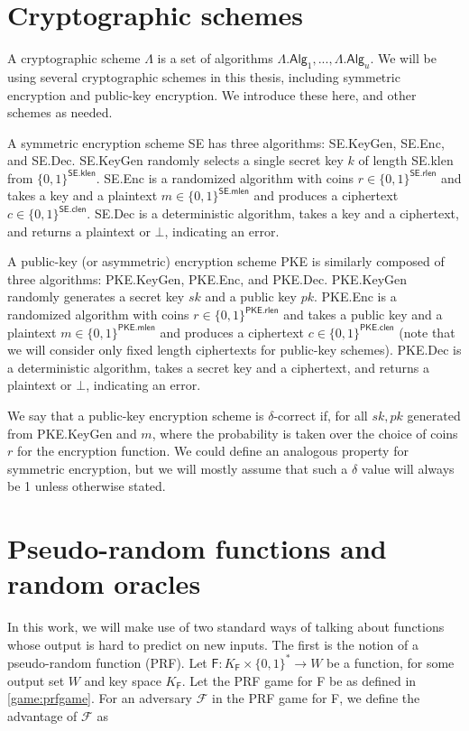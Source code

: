 \section{Cryptographic schemes}
A cryptographic scheme $\mathsf{\Lambda}$ is a set of algorithms $\mathsf{\Lambda.Alg}_1,..., \mathsf{\Lambda.Alg}_u$. We will be using several cryptographic schemes in this thesis, including symmetric encryption and public-key encryption. We introduce these here, and other schemes as needed.

A symmetric encryption scheme \textsf{SE} has three algorithms: \textsf{SE.KeyGen}, \textsf{SE.Enc}, and \textsf{SE.Dec}. \textsf{SE.KeyGen} randomly selects a single secret key $k$ of length \textsf{SE.klen} from $\{0,1\}^\mathsf{SE.klen}$. \textsf{SE.Enc} is a randomized algorithm with coins $r\in \{0,1\}^\mathsf{SE.rlen}$ and takes a key and a plaintext $m\in \{0,1\}^\mathsf{SE.mlen}$ and produces a ciphertext $c\in \{0,1\}^\mathsf{SE.clen}$. \textsf{SE.Dec} is a deterministic algorithm, takes a key and a ciphertext, and returns a plaintext or $\bot$, indicating an error.

A public-key (or asymmetric) encryption scheme \textsf{PKE} is similarly composed of three algorithms: \textsf{PKE.KeyGen}, \textsf{PKE.Enc}, and \textsf{PKE.Dec}. \textsf{PKE.KeyGen} randomly generates a secret key $sk$ and a public key $pk$. \textsf{PKE.Enc} is a randomized algorithm with coins $r\in \{0,1\}^\mathsf{PKE.rlen}$ and takes a public key and a plaintext $m\in \{0,1\}^\mathsf{PKE.mlen}$ and produces a ciphertext $c\in \{0,1\}^\mathsf{PKE.clen}$ (note that we will consider only fixed length ciphertexts for public-key schemes). \textsf{PKE.Dec} is a deterministic algorithm, takes a secret key and a ciphertext, and returns a plaintext or $\bot$, indicating an error.

We say that a public-key encryption scheme is $\delta$-correct if, for all $sk,pk$ generated from \textsf{PKE.KeyGen} and $m$,
where the probability is taken over the choice of coins $r$ for the encryption function. We could define an analogous property for symmetric encryption, but we will mostly assume that such a $\delta$ value will always be 1 unless otherwise stated.

\section{Pseudo-random functions and random oracles}
In this work, we will make use of two standard ways of talking about functions whose output is hard to predict on new inputs. The first is the notion of a pseudo-random function (PRF). Let $\mathsf{F}:K_\mathsf{F}\times \{0,1\}^* \rightarrow W$ be a function, for some output set $W$ and key space $K_\mathsf{F}$. Let the PRF game for \textsf{F} be as defined in \autoref{game:prfgame}. For an adversary $\mathcal{F}$ in the PRF game for \textsf{F}, we define the advantage of $\mathcal{F}$ as

